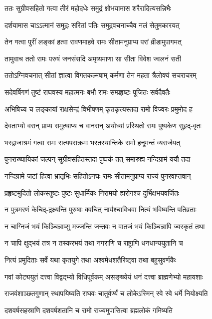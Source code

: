 \twolineshloka
{ततः सुग्रीवसहितो गत्वा तीरं महोदधेः}
{समुद्रं क्षोभयामास शरैरादित्यसन्निभैः}%

\twolineshloka
{दर्शयामास चाऽऽत्मानं समुद्रः सरितां पतिः}
{समुद्रवचनाच्चैव नलं सेतुमकारयत्}%

\twolineshloka
{तेन गत्वा पुरीं लङ्कां हत्वा रावणमाहवे}
{रामः सीतामनुप्राप्य परां व्रीडामुपागमत्}%

\twolineshloka
{तामुवाच ततो रामः परुषं जनसंसदि}
{अमृष्यमाणा सा सीता विवेश ज्वलनं सती}%

\twolineshloka
{ततोऽग्निवचनात् सीतां ज्ञात्वा विगतकल्मषाम्}
{कर्मणा तेन महता त्रैलोक्यं सचराचरम्}%

\twolineshloka
{सदेवर्षिगणं तुष्टं राघवस्य महात्मनः}
{बभौ रामः सम्प्रहृष्टः पूजितः सर्वदैवतैः}%

\twolineshloka
{अभिषिच्य च लङ्कायां राक्षसेन्द्रं विभीषणम्}
{कृतकृत्यस्तदा रामो विज्वरः प्रमुमोद ह}%

\twolineshloka
{देवताभ्यो वरान् प्राप्य समुत्थाप्य च वानरान्}
{अयोध्यां प्रस्थितो रामः पुष्पकेण सुहृद्-वृतः}%

\twolineshloka
{भरद्वाजाश्रमं गत्वा रामः सत्यपराक्रमः}
{भरतस्यान्तिके रामो हनूमन्तं व्यसर्जयत्}%

\twolineshloka
{पुनराख्यायिकां जल्पन् सुग्रीवसहितस्तदा}
{पुष्पकं तत् समारुह्य नन्दिग्रामं ययौ तदा}%

\twolineshloka
{नन्दिग्रामे जटां हित्वा भ्रातृभिः सहितोऽनघः}
{रामः सीतामनुप्राप्य राज्यं पुनरवाप्तवान्}%

\twolineshloka
{प्रहृष्टमुदितो लोकस्तुष्टः पुष्टः सुधार्मिकः}
{निरामयो ह्यरोगश्च दुर्भिक्षभयवर्जितः}%

\twolineshloka
{न पुत्रमरणं केचिद्-द्रक्ष्यन्ति पुरुषाः क्वचित्}
{नार्यश्चाविधवा नित्यं भविष्यन्ति पतिव्रताः}%

\twolineshloka
{न चाग्निजं भयं किञ्चिन्नाप्सु मज्जन्ति जन्तवः}
{न वातजं भयं किञ्चिन्नापि ज्वरकृतं तथा}%

\twolineshloka
{न चापि क्षुद्भयं तत्र न तस्करभयं तथा}
{नगराणि च राष्ट्राणि धनधान्ययुतानि च}%

\twolineshloka
{नित्यं प्रमुदिताः सर्वे यथा कृतयुगे तथा}
{अश्वमेधशतैरिष्ट्वा तथा बहुसुवर्णकैः}%

\twolineshloka
{गवां कोट्ययुतं दत्त्वा विद्वद्‌भ्यो विधिपूर्वकम्}
{असङ्ख्येयं धनं दत्त्वा ब्राह्मणेभ्यो महायशाः}%

\twolineshloka
{राजवंशाञ्छतगुणान् स्थापयिष्यति राघवः}
{चातुर्वर्ण्यं च लोकेऽस्मिन् स्वे स्वे धर्मे नियोक्ष्यति}%

\twolineshloka
{दशवर्षसहस्राणि दशवर्षशतानि च}
{रामो राज्यमुपासित्वा ब्रह्मलोकं गमिष्यति}%

